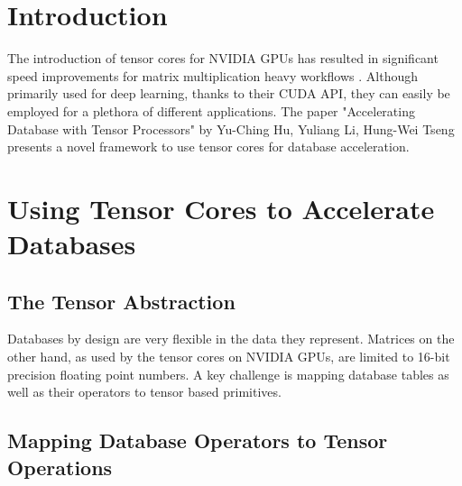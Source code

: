 \documentclass{paper}
\title{\titleVar}
\author{David R. Zollikofer\\ ETH Zürich}
\date{\today}
\begin{document}
	
	
	
	
	\section{Introduction}
	The introduction of tensor cores for NVIDIA GPUs has resulted in significant speed improvements for matrix multiplication heavy workflows \cite{markidis2018nvidia}. Although primarily used for deep learning, thanks to their CUDA API, they can easily be employed for a plethora of different applications. The paper "Accelerating Database with Tensor Processors" by Yu-Ching Hu, Yuliang Li, Hung-Wei Tseng \cite{hu2021tcudb} presents a novel framework to use tensor cores for database acceleration.
	
	\section{Using Tensor Cores to Accelerate Databases}
	
	\subsection{The Tensor Abstraction}
	Databases by design are very flexible in the data they represent. Matrices on the other hand, as used by the tensor cores on NVIDIA GPUs, are limited to 16-bit precision floating point numbers. A key challenge is mapping database tables as well as their operators to tensor based primitives.
	
	\subsection{Mapping Database Operators to Tensor Operations} \label{sec:map}
	
\end{document}
